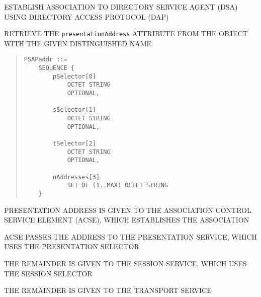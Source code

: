 \begin{bwslide}

\begin{nrtc}
\item	ESTABLISH ASSOCIATION TO DIRECTORY SERVICE AGENT (DSA)
	USING DIRECTORY ACCESS PROTOCOL (DAP)

\item	RETRIEVE THE \verb"presentationAddress" ATTRIBUTE FROM
	THE OBJECT WITH THE GIVEN DISTINGUISHED NAME
\end{nrtc}

\begin{quote}\small\begin{verbatim}
PSAPaddr ::=
    SEQUENCE {
        pSelector[0]
            OCTET STRING
            OPTIONAL,

        sSelector[1]
            OCTET STRING
            OPTIONAL,

        tSelector[2]
            OCTET STRING
            OPTIONAL,

        nAddresses[3]
            SET OF (1..MAX) OCTET STRING
    }
\end{verbatim}\end{quote}
\end{bwslide}


\begin{bwslide}

\begin{nrtc}
\item	PRESENTATION ADDRESS IS GIVEN TO THE ASSOCIATION CONTROL SERVICE
	ELEMENT (ACSE), WHICH ESTABLISHES THE ASSOCIATION

\item	ACSE PASSES THE ADDRESS TO THE PRESENTATION SERVICE,
	WHICH USES THE PRESENTATION SELECTOR

\item	THE REMAINDER IS GIVEN TO THE SESSION SERVICE,
	WHICH USES THE SESSION SELECTOR

\item	THE REMAINDER IS GIVEN TO THE TRANSPORT SERVICE
\end{nrtc}
\end{bwslide}


